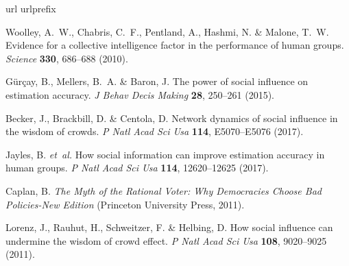 \documentclass[9pt,a4paper,twocolumn,lineno]{article}
\begin{document}
\begin{thebibliography}{10}
\expandafter\ifx\csname url\endcsname\relax
  \def\url#1{\texttt{#1}}\fi
\expandafter\ifx\csname urlprefix\endcsname\relax\def\urlprefix{URL }\fi
\providecommand{\bibinfo}[2]{#2}
\providecommand{\eprint}[2][]{\url{#2}}

\bibinfo{author}{Woolley, A.~W.}, \bibinfo{author}{Chabris, C.~F.},
  \bibinfo{author}{Pentland, A.}, \bibinfo{author}{Hashmi, N.} \&
  \bibinfo{author}{Malone, T.~W.}
\newblock \bibinfo{title}{Evidence for a collective intelligence factor in the
  performance of human groups}.
\newblock \emph{\bibinfo{journal}{Science}} \textbf{\bibinfo{volume}{330}},
  \bibinfo{pages}{686--688} (\bibinfo{year}{2010}).

\bibinfo{author}{G{\"u}r{\c{c}}ay, B.}, \bibinfo{author}{Mellers, B.~A.} \&
  \bibinfo{author}{Baron, J.}
\newblock \bibinfo{title}{The power of social influence on estimation
  accuracy}.
\newblock \emph{\bibinfo{journal}{J Behav Decis Making}}
  \textbf{\bibinfo{volume}{28}}, \bibinfo{pages}{250--261}
  (\bibinfo{year}{2015}).

\bibinfo{author}{Becker, J.}, \bibinfo{author}{Brackbill, D.} \&
  \bibinfo{author}{Centola, D.}
\newblock \bibinfo{title}{Network dynamics of social influence in the wisdom of
  crowds}.
\newblock \emph{\bibinfo{journal}{P Natl Acad Sci Usa}}
  \textbf{\bibinfo{volume}{114}}, \bibinfo{pages}{E5070--E5076}
  (\bibinfo{year}{2017}).

\bibinfo{author}{Jayles, B.} \emph{et~al.}
\newblock \bibinfo{title}{How social information can improve estimation
  accuracy in human groups}.
\newblock \emph{\bibinfo{journal}{P Natl Acad Sci Usa}}
  \textbf{\bibinfo{volume}{114}}, \bibinfo{pages}{12620--12625}
  (\bibinfo{year}{2017}).

\bibinfo{author}{Caplan, B.}
\newblock \emph{\bibinfo{title}{The Myth of the Rational Voter: Why Democracies
  Choose Bad Policies-New Edition}} (\bibinfo{publisher}{Princeton University
  Press}, \bibinfo{year}{2011}).

\bibinfo{author}{Lorenz, J.}, \bibinfo{author}{Rauhut, H.},
  \bibinfo{author}{Schweitzer, F.} \& \bibinfo{author}{Helbing, D.}
\newblock \bibinfo{title}{How social influence can undermine the wisdom of
  crowd effect}.
\newblock \emph{\bibinfo{journal}{P Natl Acad Sci Usa}}
  \textbf{\bibinfo{volume}{108}}, \bibinfo{pages}{9020--9025}
  (\bibinfo{year}{2011}).


\end{thebibliography}
\end{document}
